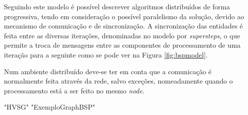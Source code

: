Seguindo este modelo é possível descrever algoritmos distribuídos de forma 
progressiva, tendo em consideração o possível paralelismo da solução, devido ao 
mecanismo de comunicação e de sincronização. A sincronização das entidades é  
feita entre as diversas iterações, denominadas no modelo por 
\textit{supersteps}, o que permite a troca de mensagens entre as componentes de 
processamento de uma iteração para a seguinte como se pode ver na Figura 
\ref{fig:bspmodel}.

Num ambiente distribuído deve-se ter em conta que a comunicação é normalmente 
feita através da rede, salvo exceções, nomeadamente quando o processamento 
está a ser feito no mesmo \textit{node}.

{"HVSG"}
{"ExemploGraphBSP"}